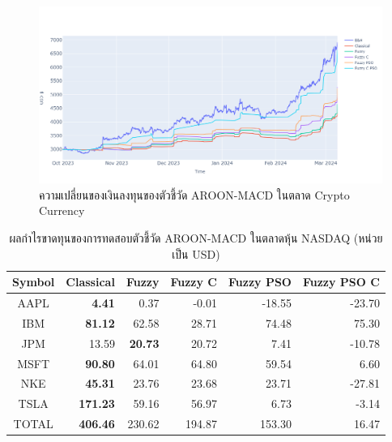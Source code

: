 \begin{figure}[!h]
    \centering
    \includegraphics[width=\textwidth]{images/aroon-macd/crypto-result.png}
    \caption{ความเปลี่ยนของเงินลงทุนของตัวชี้วัด AROON-MACD ในตลาด Crypto Currency}
    \label{fig:aroon-macd-crypto}
\end{figure}

\begin{table}[!h]
    \centering
    \begin{tabular}{crrrrr}
        \hline
        \textbf{Symbol} & \textbf{Classical} & \textbf{Fuzzy} & \textbf{Fuzzy C} & \textbf{Fuzzy PSO} & \textbf{Fuzzy PSO C} \\ \hline
        AAPL            & \textbf{4.41}      & 0.37           & -0.01            & -18.55             & -23.70               \\ \hline
        IBM             & \textbf{81.12}     & 62.58          & 28.71            & 74.48              & 75.30                \\ \hline
        JPM             & 13.59              & \textbf{20.73} & 20.72            & 7.41               & -10.78               \\ \hline
        MSFT            & \textbf{90.80}     & 64.01          & 64.80            & 59.54              & 6.60                 \\ \hline
        NKE             & \textbf{45.31}     & 23.76          & 23.68            & 23.71              & -27.81               \\ \hline
        TSLA            & \textbf{171.23}    & 59.16          & 56.97            & 6.73               & -3.14                \\ \hline
        TOTAL           & \textbf{406.46}    & 230.62         & 194.87           & 153.30             & 16.47                \\ \hline
    \end{tabular}
    \caption{ผลกำไรขาดทุนของการทดสอบตัวชี้วัด AROON-MACD ในตลาดหุ้น NASDAQ (หน่วยเป็น USD)}
    \label{tab:aroon-macd-stocks}
\end{table}

